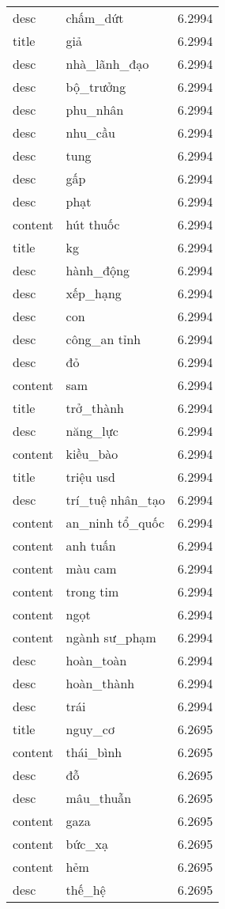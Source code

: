 \documentclass{article}
\begin{document}
\begin{tabular}{lll}
desc & chấm\_dứt & 6.2994\\
title & giả & 6.2994\\
desc & nhà\_lãnh\_đạo & 6.2994\\
desc & bộ\_trưởng & 6.2994\\
desc & phu\_nhân & 6.2994\\
desc & nhu\_cầu & 6.2994\\
desc & tung & 6.2994\\
desc & gấp & 6.2994\\
desc & phạt & 6.2994\\
content & hút thuốc & 6.2994\\
title & kg & 6.2994\\
desc & hành\_động & 6.2994\\
desc & xếp\_hạng & 6.2994\\
desc & con & 6.2994\\
desc & công\_an tỉnh & 6.2994\\
desc & đỏ & 6.2994\\
content & sam & 6.2994\\
title & trở\_thành & 6.2994\\
desc & năng\_lực & 6.2994\\
content & kiều\_bào & 6.2994\\
title & triệu usd & 6.2994\\
desc & trí\_tuệ nhân\_tạo & 6.2994\\
content & an\_ninh tổ\_quốc & 6.2994\\
content & anh tuấn & 6.2994\\
content & màu cam & 6.2994\\
content & trong tim & 6.2994\\
content & ngọt & 6.2994\\
content & ngành sư\_phạm & 6.2994\\
desc & hoàn\_toàn & 6.2994\\
desc & hoàn\_thành & 6.2994\\
desc & trái & 6.2994\\
title & nguy\_cơ & 6.2695\\
content & thái\_bình & 6.2695\\
desc & đỗ & 6.2695\\
desc & mâu\_thuẫn & 6.2695\\
content & gaza & 6.2695\\
content & bức\_xạ & 6.2695\\
content & hẻm & 6.2695\\
desc & thế\_hệ & 6.2695\\

\end{tabular}
\end{document}
